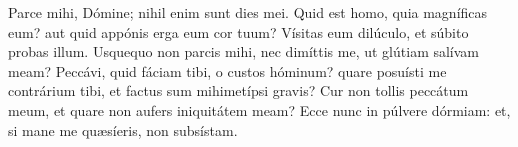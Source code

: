 Parce mihi, Dómine; nihil enim sunt dies mei.
Quid est homo, quia magníficas eum?
	aut quid appónis erga eum cor tuum?
Vísitas eum dilúculo, et súbito probas illum.
Usquequo non parcis mihi, nec dimíttis me, ut glútiam salívam meam?
Peccávi, quid fáciam tibi, o custos hóminum?
	quare posuísti me contrárium tibi, et factus sum mihimetípsi gravis?
Cur non tollis peccátum meum, et quare non aufers iniquitátem meam?
Ecce nunc in púlvere dórmiam:
	et, si mane me quæsíeris, non subsístam.
